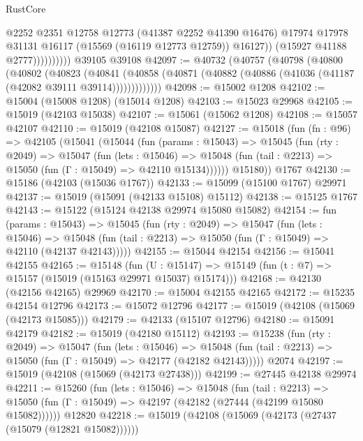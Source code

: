 \begin{lexlean}{RustCore}
\begin{coremodule}
                          @2252
                          @2351
                          @12758
                          @12773
                          (@41387 @2252 @41390 @16476)
                          @17974
                          @17978
                          @31131
                          @16117
                          (@15569 (@16119 @12773 @12759))
                          @16127))
                      (@15927 @41188 @2777))))))))))
    @39105
    @39108
@42097 := @40732
    (@40757
      (@40798
        (@40800
          (@40802
            (@40823
              (@40841
                (@40858 (@40871 (@40882 (@40886 (@41036 (@41187 (@42082 @39111 @39114)))))))))))))
@42098 := @15002 @1208
@42102 := @15004 (@15008 @1208) (@15014 @1208)
@42103 := @15023 @29968
@42105 := @15019 (@42103 @15038)
@42107 := @15061 (@15062 @1208)
@42108 := @15057 @42107
@42110 := @15019 (@42108 @15087)
@42127 := @15018
    (fun (fn : @96) =>
    @42105
      (@15041
        (@15044
          (fun (params : @15043) =>
          @15045
            (fun (rty : @2049) =>
            @15047
              (fun (lets : @15046) =>
              @15048 (fun (tail : @2213) => @15050 (fun (Γ : @15049) => @42110 @15134))))))
        @15180))
    @1767
@42130 := @15186 (@42103 (@15036 @1767))
@42133 := @15099 (@15100 @1767) @29971
@42137 := @15019 (@15091 (@42133 @15108) @15112)
@42138 := @15125 @1767
@42143 := @15122 (@15124 @42138 @29974 @15080 @15082)
@42154 := fun (params : @15043) =>
  @15045
    (fun (rty : @2049) =>
    @15047
      (fun (lets : @15046) =>
      @15048 (fun (tail : @2213) => @15050 (fun (Γ : @15049) => @42110 (@42137 @42143)))))
@42155 := @15044 @42154
@42156 := @15041 @42155
@42165 := @15148
    (fun (U : @15147) => @15149 (fun (t : @7) => @15157 (@15019 (@15163 @29971 @15037) @15174)))
@42168 := @42130 (@42156 @42165) @29969
@42170 := @15004 @42155 @42165
@42172 := @15235 @42154 @12796
@42173 := @15072 @12796
@42177 := @15019 (@42108 (@15069 (@42173 @15085)))
@42179 := @42133 (@15107 @12796)
@42180 := @15091 @42179
@42182 := @15019 (@42180 @15112)
@42193 := @15238
    (fun (rty : @2049) =>
    @15047
      (fun (lets : @15046) =>
      @15048 (fun (tail : @2213) => @15050 (fun (Γ : @15049) => @42177 (@42182 @42143)))))
    @2074
@42197 := @15019 (@42108 (@15069 (@42173 @27438)))
@42199 := @27445 @42138 @29974
@42211 := @15260
    (fun (lets : @15046) =>
    @15048
      (fun (tail : @2213) =>
      @15050 (fun (Γ : @15049) => @42197 (@42182 (@27444 (@42199 @15080 @15082))))))
    @12820
@42218 := @15019 (@42108 (@15069 (@42173 (@27437 (@15079 (@12821 @15082))))))

\end{coremodule}
\end{lexlean}
